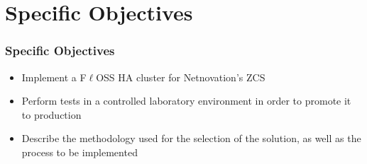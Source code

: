 \section{Specific Objectives}

\begin{frame}
\frametitle{Specific Objectives}

\begin{itemize}
  \item Implement a F$\ell$OSS HA cluster for Netnovation's ZCS
  \item Perform tests in a controlled laboratory environment in order to promote it to production
  \item Describe the methodology used for the selection of the solution, as well as the process to be implemented
\end{itemize}

\end{frame}